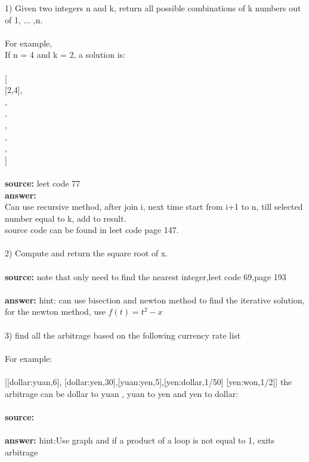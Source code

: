 \documentclass[11pt,fleqn]{book} %
\begin{document}
1) Given two integers n and k, return all possible combinations of k numbers out of 1, ... ,n.\\
\\
For example,\\
If n = 4 and k = 2, a solution is:\\
\\
{[}\\
{[2,4]},\\
\qquad {[3,4]},\\
\qquad {[2,3]},\\
\qquad {[1,2]},\\
\qquad {[1,3]},\\
\qquad {[1,4]},\\
{]}\\
\\
\textbf{source:} leet code 77
\\
\textbf{answer:}\\
Can use recursive method, after join i, next time start from i+1 to n, till selected number equal to k, add to result.\\
source code can be found in leet code page 147.\\\\
2) Compute and return the square root of x.\\
\\
\textbf{source:} note that only need to find the nearest integer,leet code 69,page 193\\
\\
\textbf{answer:} hint: can use bisection and newton method to find the iterative solution, for the newton method, use $f(t)=t^2-x$\\
\\
3) find all the arbitrage based on the following currency rate list\\\\
For example:\\\\
{[[dollar:yuan,6], [dollar:yen,30],[yuan:yen,5],[yen:dollar,1/50] [yen:won,1/2]]}
the arbitrage can be dollar to yuan , yuan to yen and yen to dollar:\\\\
\textbf{source:} \\\\
\textbf{answer:} hint:Use graph and if a product of a loop is not equal to 1, exits arbitrage\\\\
\
\end{document}
